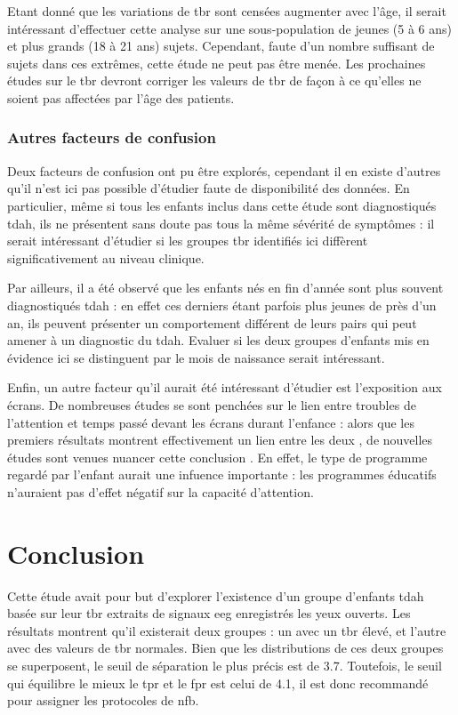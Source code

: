 Etant donné que les variations de \gls{tbr} sont censées augmenter avec l'âge, il serait intéressant d'effectuer cette analyse sur une sous-population de jeunes (5 
à 6 ans) et plus grands (18 à 21 ans) sujets. Cependant, faute d'un nombre suffisant de sujets dans ces extrêmes, cette étude ne peut pas être menée. Les prochaines
études sur le \gls{tbr} devront corriger les valeurs de \gls{tbr} de façon à ce qu'elles ne soient pas affectées par l'âge des patients.

\subsubsection{Autres facteurs de confusion}

Deux facteurs de confusion ont pu être explorés, cependant il en existe d'autres qu'il n'est ici pas possible d'étudier faute de disponibilité des données.
En particulier, même si tous les enfants inclus dans cette étude sont diagnostiqués \gls{tdah}, ils ne présentent sans doute pas tous la même sévérité de symptômes : il serait
intéressant d'étudier si les groupes \gls{tbr} identifiés ici diffèrent significativement au niveau clinique. 

Par ailleurs, il a été observé que les enfants nés en fin d'année sont plus souvent diagnostiqués \gls{tdah} \citep{Layton2018} : en effet ces derniers 
étant parfois plus jeunes de près d'un an, ils peuvent présenter un comportement différent de leurs pairs qui peut amener à un diagnostic du \gls{tdah}. Evaluer si 
les deux groupes d'enfants mis en évidence ici se distinguent par le mois de naissance serait intéressant.

Enfin, un autre facteur qu'il aurait été intéressant d'étudier est l'exposition aux écrans. De nombreuses études se sont penchées sur le lien 
entre troubles de l'attention et temps passé devant les écrans durant l'enfance : alors que les premiers résultats montrent effectivement un lien 
entre les deux \citep{Swing2010, Christakis2004}, de nouvelles études sont venues nuancer cette conclusion \citep{Schmidt2008, Lillard2011, Zimmerman2007, Kostyrka2017}.
En effet, le type de programme regardé par l'enfant aurait une infuence importante : les programmes éducatifs n'auraient pas d'effet négatif sur 
la capacité d'attention.


\section{Conclusion}

Cette étude avait pour but d'explorer l'existence d'un groupe d'enfants \gls{tdah} basée sur leur \gls{tbr} extraits de signaux \gls{eeg} enregistrés les yeux 
ouverts. Les résultats montrent qu'il existerait deux groupes : un avec un \gls{tbr} élevé, et l'autre avec des valeurs de \gls{tbr} normales. Bien que les 
distributions de ces deux groupes se superposent, le seuil de séparation le plus précis est de 3.7. Toutefois, le seuil qui équilibre le mieux
le \gls{tpr} et le \gls{fpr} est celui de 4.1, il est donc recommandé pour assigner les protocoles de \gls{nfb}. 

